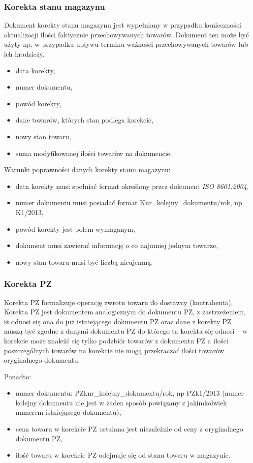 \subsubsection{Korekta stanu magazynu}
Dokument korekty stanu magazynu jest wypełniany w przypadku
konieczności aktualizacji ilości faktycznie przechowywanych towarów.
Dokument ten może być użyty np. w przypadku upływu terminu ważności
przechowywanych towarów lub ich kradzieży.
\begin{itemize}
\item data korekty,
\item numer dokumentu,
\item powód korekty,
\item dane towarów, których stan podlega korekcie,
\item nowy stan towaru,
\item suma modyfikowanej ilości towarów na dokumencie.
\end{itemize}

Warunki poprawności danych korekty stanu magazynu:
\begin{itemize}
\item data korekty musi spełniać format określony przez dokument \emph{ISO 8601:2004},
\item numer dokumentu musi posiadać format Knr\_kolejny\_dokumentu/rok, np. K1/2013,
\item powód korekty jest polem wymaganym,
\item dokument musi zawierać informację o co najmniej jednym towarze,
\item nowy stan towaru musi być liczbą nieujemną.
\end{itemize}

\subsubsection{Korekta PZ}
Korekta PZ formalizuje operację zwrotu towaru do dostawcy
(kontrahenta).  Korekta PZ jest dokumentem analogicznym do dokumentu
PZ, z zastrzeżeniem, iż odnosi się ona do już istniejącego dokumentu
PZ oraz dane z korekty PZ muszą być zgodne z danymi dokumentu PZ do
którego ta korekta się odnosi -- w korekcie może znaleźć się tylko
podzbiór towarów z dokumentu PZ a ilości poszczególnych towarów na
korekcie nie mogą przekraczać ilości towarów oryginalnego dokumentu.

Ponadto:
\begin{itemize}
\item numer dokumentu: PZknr\_kolejny\_dokumentu/rok, np PZk1/2013
  (numer kolejny dokumentu nie jest w żaden sposób powiązany z
  jakimkolwiek numerem istniejącego dokumentu),
\item cena towaru w korekcie PZ ustalana jest niezależnie od ceny z
  oryginalnego dokumentu PZ,
\item ilość towaru w korekcie PZ odejmuje się od stanu towaru w
  magazynie.
\end{itemize}

